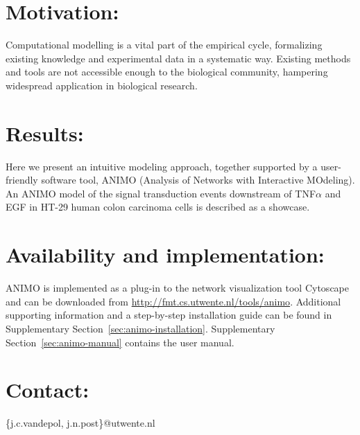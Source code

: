 \section{Motivation:}
Computational modelling is a vital part of the empirical cycle, formalizing
existing knowledge and experimental data in a systematic way. Existing methods
and tools are not accessible enough to the biological community, hampering
widespread application in biological research.
\section{Results:}
Here we present an intuitive modeling approach, together supported
by a user-friendly software tool, ANIMO (Analysis of Networks with Interactive
MOdeling). An ANIMO model of the signal transduction events
downstream of TNF$\alpha$ and EGF in HT-29 human colon carcinoma
cells is described as a showcase.
\section{Availability and implementation:}
ANIMO is implemented as a plug-in to the network visualization tool Cytoscape
and can be downloaded from \url{http://fmt.cs.utwente.nl/tools/animo}.
Additional supporting information and a step-by-step installation guide can be found
in Supplementary Section~\ref{sec:animo-installation}. Supplementary Section~\ref{sec:animo-manual}
contains the user manual.
\section{Contact:} \{j.c.vandepol, j.n.post\}@utwente.nl